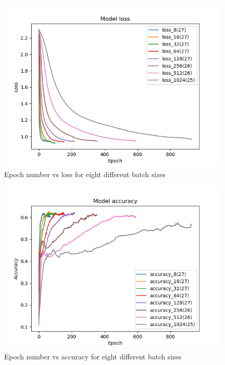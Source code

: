 \documentclass[conference]{IEEEtran}
\begin{document}
\begin{figure}
  \includegraphics[width=\linewidth]{figs/batch_size_loss.png}
  \caption{Epoch number vs loss for eight different batch sizes}
  \label{fig:batch_size_loss}
\end{figure}
\begin{figure}
  \includegraphics[width=\linewidth]{figs/batch_size_accuracy.png}
  \caption{Epoch number vs accuracy for eight different batch sizes}
  \label{fig:batch_size_accuracy}
\end{figure}
\end{document}
